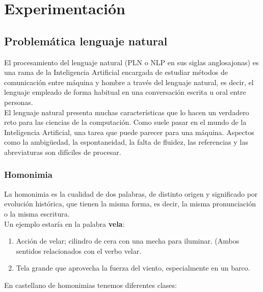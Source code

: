 \documentclass[../all.tex]{subfiles}
\begin{document}
\section{Experimentación} %

\subsection{Problemática lenguaje natural}
El procesamiento del lenguaje natural (PLN o NLP en sus siglas anglosajonas) es una rama de la Inteligencia Artificial encargada de estudiar métodos de comunicación entre máquina y hombre a través del lenguaje natural, es decir, el lenguaje empleado de forma habitual en una conversación escrita u oral entre personas.\\ 

El lenguaje natural presenta muchas características que lo hacen un verdadero reto para las ciencias de la computación. Como suele pasar en el mundo de la Inteligencia Artificial, una tarea que puede parecer para una máquina. Aspectos como la ambigüedad, la espontaneidad, la falta de fluidez, las referencias y las abreviaturas son difíciles de procesar.

\subsubsection{Homonimia}
	La homonimia  es la cualidad de dos palabras, de distinto origen y significado por evolución histórica, que tienen la misma forma, es decir, la misma pronunciación o la misma escritura.\\
	
	Un ejemplo estaría en la palabra \textbf{vela}:
	\begin{enumerate}[resume]
		\setcounter{enumi}{0}
		\item Acción de velar; cilindro de cera con una mecha para iluminar. (Ambos sentidos relacionados con el verbo velar.
		\item Tela grande que aprovecha la fuerza del viento, especialmente en un barco.
	\end{enumerate}

	En castellano de homonimias tenemos diferentes clases:
	
\end{document}
